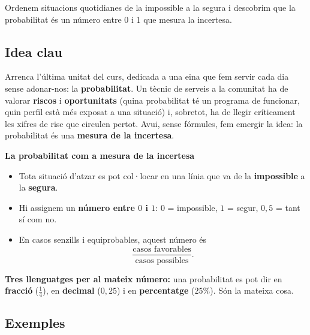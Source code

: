 %
{Ordenem situacions quotidianes de la impossible a la segura i descobrim que la probabilitat és un número entre 0 i 1 que mesura la incertesa.}

\subsection{Idea clau}

Arrenca l'última unitat del curs, dedicada a una eina que fem servir cada dia sense
adonar-nos: la \textbf{probabilitat}. Un tècnic de serveis a la comunitat ha de valorar
\textbf{riscos} i \textbf{oportunitats} (quina probabilitat té un programa de funcionar,
quin perfil està més exposat a una situació) i, sobretot, ha de llegir críticament les
xifres de risc que circulen pertot. Avui, sense fórmules, fem emergir la idea: la
probabilitat és una \textbf{mesura de la incertesa}.

\begin{idea}
\textbf{La probabilitat com a mesura de la incertesa}
\begin{itemize}[leftmargin=1.4em, itemsep=2pt]
  \item Tota situació d'atzar es pot col·locar en una línia que va de la
        \textbf{impossible} a la \textbf{segura}.
  \item Hi assignem un \textbf{número entre $0$ i $1$}: \quad $0$ = impossible, \quad
        $1$ = segur, \quad $0,5$ = tant sí com no.
  \item En casos senzills i equiprobables, aquest número és
        \[
        \frac{\text{casos favorables}}{\text{casos possibles}}.
        \]
\end{itemize}
\textbf{Tres llenguatges per al mateix número:} una probabilitat es pot dir en
\textbf{fracció} ($\frac{1}{4}$), en \textbf{decimal} ($0,25$) i en \textbf{percentatge}
($25\%$). Són la mateixa cosa.
\end{idea}

\subsection{Exemples}

